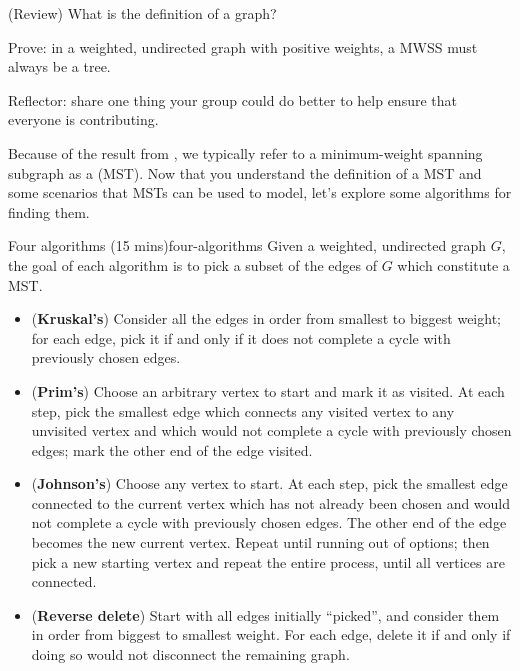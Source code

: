 \documentclass{tufte-handout}
\begin{document}
\begin{questions}
\item (Review) What is the definition of a  graph?
\item \label{q:mwss-tree} Prove: in a weighted, undirected graph with
  positive weights, a MWSS must always be a tree. 
  \vspace{2in}
\item Reflector: share one thing your group could do better to help
  ensure that everyone is contributing.
\end{questions}

\pause

Because of the result from , we typically refer to
a minimum-weight spanning subgraph as a 
(MST).  Now that you understand the definition of a MST and some
scenarios that MSTs can be used to model, let's explore some
algorithms for finding them.

\begin{model*}{Four algorithms (15 mins)}{four-algorithms}
  Given a weighted, undirected graph $G$, the goal of each algorithm
  is to pick a subset of the edges of $G$ which constitute a MST.
  \begin{itemize}
  \item (\textbf{Kruskal's}) Consider all the edges in order from
    smallest to biggest weight; for each edge, pick it if and only if
    it does not complete a cycle with previously chosen edges.
  \item (\textbf{Prim's}) Choose an arbitrary vertex to start and mark
    it as visited.  At each step, pick the smallest edge which
    connects any visited vertex to any unvisited vertex and which would
    not complete a cycle with previously chosen edges; mark the other
    end of the edge visited.
  \item (\textbf{Johnson's}) Choose any vertex to start.  At each
    step, pick the smallest edge connected to the current vertex which
    has not already been chosen and would not complete a cycle with
    previously chosen edges.  The other end of the edge becomes the
    new current vertex.  Repeat until running out of options; then
    pick a new starting vertex and repeat the entire process, until
    all vertices are connected.
  \item (\textbf{Reverse delete}) Start with all edges initially
    ``picked'', and consider them in order from biggest to smallest
    weight.  For each edge, delete it if and only if doing so would
    not disconnect the remaining graph.
  \end{itemize}
\end{model*}
\end{document}
